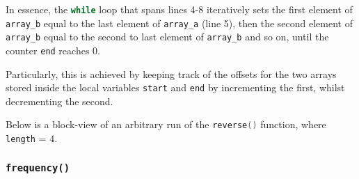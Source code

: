 \documentclass{article}
\newcommand{\code}[1]{\lstinline[language=C]!#1!}
\begin{document}
	In essence, the \code{while} loop that spans lines 4-8 iteratively sets the first element of
	\code{array_b} equal to the last element of \code{array_a} (line 5), then the second element of
	\code{array_b} equal to the second to last element of \code{array_b} and so on, until the counter
	\code{end} reaches 0. 

	Particularly, this is achieved by keeping track of the offsets for the two arrays stored inside the
	local variables \code{start} and \code{end} by incrementing the first, whilst decrementing the
	second.

	Below is a block-view of an arbitrary run of the \code{reverse()} function, where \code{length} = 4.

	

	\newpage

	\subsubsection{\texttt{frequency()}}

	
\end{document}
